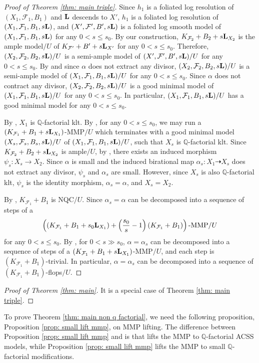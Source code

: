 \documentclass[11pt]{amsart}
\numberwithin{equation}{section}
\newcommand{\Qq}{\mathbb{Q}}
\newcommand{\Ff}{\mathcal{F}}
\newcommand{\Ll}{{\bf{L}}}
\theoremstyle{definition}
\theoremstyle{definition}
\theoremstyle{definition}
\begin{document}
\begin{proof}[Proof of Theorem \ref{thm: main triple}]
Since $h_1$ is a foliated log resolution of $(X_1,\Ff_1,B_1)$ and $\Ll$ descends to $X'$, $h_1$ is a foliated log resolution of $(X_1,\Ff_1,B_1,s\Ll)$, and $(X',\Ff',B',s\Ll)$ is a foliated log smooth model of $(X_1,\Ff_1,B_1,s\Ll)$ for any $0<s\leq s_0$. By our construction, $K_{\Ff_2}+B_2+s\Ll_{X_2}$ is the ample model$/U$ of $K_{\Ff'}+B'+s\Ll_{X'}$ for any $0<s\leq s_0$. Therefore, $(X_2,\Ff_2,B_2,s\Ll)/U$ is a semi-ample model of $(X',\Ff',B',s\Ll)/U$ for any $0<s\leq s_0$. By \cite[Lemma A.28]{LMX24b} and since $\alpha$ does not extract any divisor, $(X_2,\Ff_2,B_2,s\Ll)/U$ is a semi-ample model of $(X_1,\Ff_1,B_1,s\Ll)/U$ for any $0<s\leq s_0$. Since $\alpha$ does not contract any divisor, $(X_2,\Ff_2,B_2,s\Ll)/U$ is a good minimal model of $(X_1,\Ff_1,B_1,s\Ll)/U$ for any $0<s\leq s_0$. In particular,  $(X_1,\Ff_1,B_1,s\Ll)/U$ has a good minimal model for any $0<s\leq s_0$. 

By \cite[Theorem 7.2]{LMX24b}, $X_1$ is $\Qq$-factorial klt. By \cite[Theorem A.13]{LMX24b}, for any $0<s\leq s_0$, we may run a $(K_{\Ff_1}+B_1+s\Ll_{X_1})$-MMP$/U$ which terminates with a good minimal model $(X_s,\Ff_s,B_s,s\Ll)/U$ of $(X_1,\Ff_1,B_1,s\Ll)/U$, such that $X_s$ is $\Qq$-factorial klt. Since $K_{\Ff_2}+B_2+s\Ll_{X_2}$ is ample$/U$, by \cite[Lemma A.25]{LMX24b}, there exists an induced morphism $\psi_s: X_s\rightarrow X_2$. Since $\alpha$ is small and the induced birational map $\alpha_s: X_1\dashrightarrow X_s$ does not extract any divisor, $\psi_s$ and $\alpha_s$ are small. However, since $X_s$ is also $\Qq$-factorial klt, $\psi_s$ is the identity morphism, $\alpha_s=\alpha$, and $X_s=X_2$.

By \cite[Theorem 1.12]{LMX24b}, $K_{\Ff_1}+B_1$ is NQC$/U$. Since $\alpha_s=\alpha$ can be decomposed into a sequence of steps of a
$$\left((K_{\Ff_1}+B_1+s_0\Ll_{X_1})+\left(\frac{s_0}{s}-1\right)(K_{\Ff_1}+B_1)\right)\text{-MMP}/U$$
for any $0<s\leq s_0$. By \cite[Lemma B.6]{LMX24b}, for $0 <s \gg s_0$, $\alpha=\alpha_s$ can be decomposed into a sequence of steps of a $(K_{\Ff_1}+B_1+s\Ll_{X_1})$-MMP$/U$, and each step is $(K_{\Ff_1}+B_1)$-trivial. In particular, $\alpha=\alpha_s$ can be decomposed into a sequence of $(K_{\Ff_1}+B_1)$-flops$/U$.
\end{proof}

\begin{proof}[Proof of Theorem \ref{thm: main}]
    It is a special case of Theorem \ref{thm: main triple}.
\end{proof}

To prove Theorem \ref{thm: main non q factorial}, we need the following proposition, Proposition \ref{prop: small lift mmp}, on MMP lifting. The difference between  Proposition \ref{prop: small lift mmp} and \cite[Proposition 8.2]{LMX24b} is that \cite[Proposition 8.2]{LMX24b} lifts the MMP to $\Qq$-factorial ACSS models, while  Proposition \ref{prop: small lift mmp} lifts the MMP to small $\Qq$-factorial modifications. 
\end{document}
